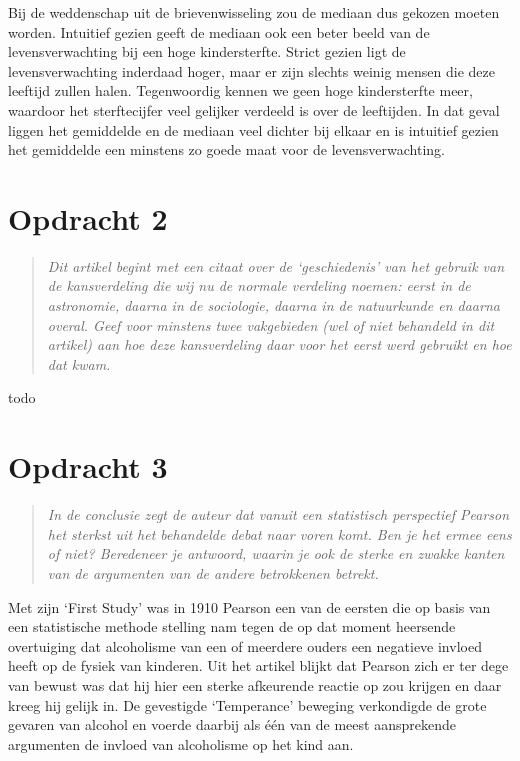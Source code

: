 \documentclass[a4paper,11pt]{article}
\begin{document}
Bij de weddenschap uit de brievenwisseling zou de mediaan dus gekozen moeten
worden. Intuitief gezien geeft de mediaan ook een beter beeld van de
levensverwachting bij een hoge kindersterfte. Strict gezien ligt de
levensverwachting inderdaad hoger, maar er zijn slechts weinig mensen die deze
leeftijd zullen halen. Tegenwoordig kennen we geen hoge kindersterfte meer,
waardoor het sterftecijfer veel gelijker verdeeld is over de leeftijden. In
dat geval liggen het gemiddelde en de mediaan veel dichter bij elkaar en is
intuitief gezien het gemiddelde een minstens zo goede maat voor de
levensverwachting.


\section*{Opdracht 2}


\begin{quote}
\emph{Dit artikel begint met een citaat over de `geschiedenis' van het gebruik
van de kansverdeling die wij nu de normale verdeling noemen: eerst in de
astronomie, daarna in de sociologie, daarna in de natuurkunde en daarna
overal. Geef voor minstens twee vakgebieden (wel of niet behandeld in dit
artikel) aan hoe deze kansverdeling daar voor het eerst werd gebruikt en hoe
dat kwam.}
\end{quote}


todo


\section*{Opdracht 3}


\begin{quote}
\emph{In de conclusie zegt de auteur dat vanuit een statistisch perspectief
  Pearson het sterkst uit het behandelde debat naar voren komt. Ben je het
  ermee eens of niet? Beredeneer je antwoord, waarin je ook de sterke en
  zwakke kanten van de argumenten van de andere betrokkenen betrekt.}
\end{quote}


Met zijn `First Study' was in 1910 Pearson een van de eersten die op basis
van een statistische methode stelling nam tegen de op dat moment heersende
overtuiging dat alcoholisme van een of meerdere ouders een negatieve invloed
heeft op de fysiek van kinderen. Uit het artikel blijkt dat Pearson zich er
ter dege van bewust was dat hij hier een sterke afkeurende reactie op zou
krijgen en daar kreeg hij gelijk in. De gevestigde `Temperance' beweging
verkondigde de grote gevaren van alcohol en voerde daarbij als \'e\'en van de
meest aansprekende argumenten de invloed van alcoholisme op het kind aan.
\end{document}
